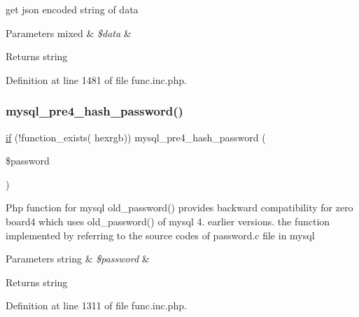 get json encoded string of data


\begin{DoxyParams}[1]{Parameters}
mixed & {\em \$data} & \\
\hline
\end{DoxyParams}
\begin{DoxyReturn}{Returns}
string 
\end{DoxyReturn}


Definition at line 1481 of file func.\+inc.\+php.

\mbox{\label{func_8inc_8php_a82aee1d4b0bcbdb52d5a723b1a0fa777}} 
\subsubsection{\texorpdfstring{mysql\+\_\+pre4\+\_\+hash\+\_\+password()}{mysql\_pre4\_hash\_password()}}
{\footnotesize\ttfamily \hyperlink{config_8inc_8php_a73b98c0274e28635a594091f9ca43cb4}{if} (!function\+\_\+exists( \textquotesingle{}hexrgb\textquotesingle{})) mysql\+\_\+pre4\+\_\+hash\+\_\+password (\begin{DoxyParamCaption}\item[{}]{\$password }\end{DoxyParamCaption})}

Php function for mysql old\+\_\+password() provides backward compatibility for zero board4 which uses old\+\_\+password() of mysql 4. earlier versions. the function implemented by referring to the source codes of password.\+c file in mysql


\begin{DoxyParams}[1]{Parameters}
string & {\em \$password} & \\
\hline
\end{DoxyParams}
\begin{DoxyReturn}{Returns}
string 
\end{DoxyReturn}


Definition at line 1311 of file func.\+inc.\+php.

\mbox{\label{func_8inc_8php_af8504615daee340af724f099cc69662f}} 
